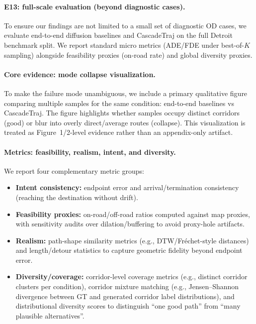 \paragraph{E13: full-scale evaluation (beyond diagnostic cases).}
To ensure our findings are not limited to a small set of diagnostic OD cases, we evaluate end-to-end diffusion baselines and CascadeTraj on the full Detroit benchmark split.
We report standard micro metrics (ADE/FDE under best-of-$K$ sampling) alongside feasibility proxies (on-road rate) and global diversity proxies.

\paragraph{Core evidence: mode collapse visualization.}
To make the failure mode unambiguous, we include a primary qualitative figure comparing multiple samples for the same condition:
end-to-end baselines vs CascadeTraj.
The figure highlights whether samples occupy distinct corridors (good) or blur into overly direct/average routes (collapse).
This visualization is treated as Figure~1/2-level evidence rather than an appendix-only artifact.

\paragraph{Metrics: feasibility, realism, intent, and diversity.}
We report four complementary metric groups:
\begin{itemize}
  \item \textbf{Intent consistency:} endpoint error and arrival/termination consistency (reaching the destination without drift).
  \item \textbf{Feasibility proxies:} on-road/off-road ratios computed against map proxies, with sensitivity audits over dilation/buffering to avoid proxy-hole artifacts.
  \item \textbf{Realism:} path-shape similarity metrics (e.g., DTW/Fr\'echet-style distances) and length/detour statistics to capture geometric fidelity beyond endpoint error.
  \item \textbf{Diversity/coverage:} corridor-level coverage metrics (e.g., distinct corridor clusters per condition), corridor mixture matching (e.g., Jensen--Shannon divergence between GT and generated corridor label distributions), and distributional diversity scores to distinguish ``one good path'' from ``many plausible alternatives''.
\end{itemize}

